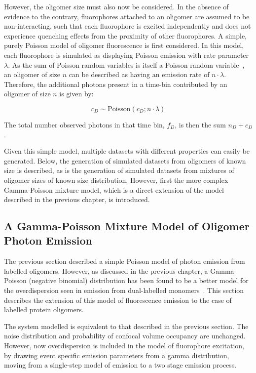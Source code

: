 However, the oligomer size must also now be considered. In the absence of evidence to the contrary, fluorophores attached to an oligomer are assumed to be non-interacting, such that each fluorophore is excited independently and does not experience quenching effects from the proximity of other fluorophores. A simple, purely Poisson model of oligomer fluorescence is first considered. In this model, each fluorophore is simulated as displaying Poisson emission with rate parameter $\lambda$. As the sum of Poisson random variables is itself a Poisson random variable~\cite{Lehmann1986}, an oligomer of size $n$ can be described as having an emission rate of $n \cdot \lambda$. Therefore, the additional photons present in a time-bin contributed by an oligomer of size $n$ is given by:

\begin{equation}
c_D \sim \text{Poisson}(c_D; n \cdot \lambda)
\label{eq:n_photons}
\end{equation} 

The total number observed photons in that time bin, $f_D$, is then the sum $n_D + c_D$.

Given this simple model, multiple datasets with different properties can easily be generated. Below, the generation of simulated datasets from oligomers of known size is described, as is the generation of simulated datasets from mixtures of oligomer sizes of known size distribution. However, first the more complex Gamma-Poisson mixture model, which is a direct extension of the model described in the previous chapter, is introduced.

\subsection{A Gamma-Poisson Mixture Model of Oligomer Photon Emission}
The previous section described a simple Poisson model of photon emission from labelled oligomers. However, as discussed in the previous chapter, a Gamma-Poisson (negative binomial) distribution has been found to be a better model for the overdispersion seen in emission from dual-labelled monomers~\cite{murphy14}. This section describes the extension of this model of fluorescence emission to the case of labelled protein oligomers.

The system modelled is equivalent to that described in the previous section. The noise distribution and probability of confocal volume occupancy are unchanged. However, now overdispersion is included in the model of fluorophore excitation, by drawing event specific emission parameters from a gamma distribution, moving from a single-step model of emission to a two stage emission process. 

